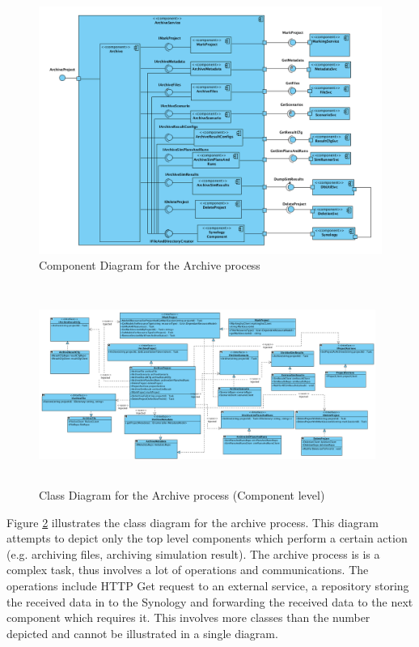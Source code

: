 \begin{figure}[H]
    \centering \includegraphics[scale=0.45]{grafiken/archiveComponent.png}
    \caption{Component Diagram for the Archive process}
    \label{fig:archiveComponent}
\end{figure}



\begin{figure}[H]
    \centering \includegraphics[height=6.5cm, angle=90, origin=c, width=11cm]{grafiken/archiveClass.png}
    \caption{Class Diagram for the Archive process (Component level)}
    \label{fig:archiveClassDiagram}
\end{figure}

Figure \ref{fig:archiveClassDiagram} illustrates the class diagram for the archive process. This diagram attempts to depict only the top level components
which perform a certain action (e.g. archiving files, archiving simulation result). The archive process is is a complex 
task, thus involves a lot of operations and communications. The operations include HTTP Get request to an external service, a repository storing the received
data in to the Synology and forwarding the received data to the next component which requires it. This involves more classes than the number depicted
and cannot be illustrated in a single diagram. 

